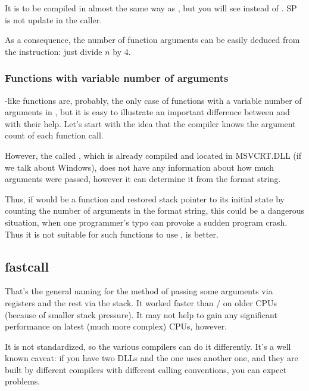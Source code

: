 It is to be compiled in almost the same way as , but you will see  instead of .
\ac{SP} is not update in the \gls{caller}.

As a consequence, 
the number of function arguments can be easily deduced from the  instruction: just divide $n$ by 4.



\subsubsection{Functions with variable number of arguments}

\printf-like functions are, probably, the only case of functions with a variable number of arguments in \CCpp,
but it is easy to illustrate an important difference between  and  with their help.
Let's start with the idea that the compiler knows the argument count of each \printf function call.

However, the called \printf, which is already compiled and located in MSVCRT.DLL (if we talk about Windows),
does not have any information about how much arguments were passed, however it can determine it from the format string.

Thus, if \printf would be a  function and restored \gls{stack pointer} to its initial state by counting
the number of arguments in the format string, this could be a dangerous situation, when one programmer's typo can
provoke a sudden program crash.
Thus it is not suitable for such functions to use ,  is better.

\subsection{fastcall}
\label{fastcall}

That's the general naming for the method of passing some arguments via registers and the 
rest via the stack. It worked faster than / on older CPUs 
(because of smaller stack pressure).
It may not help to gain any significant performance on latest (much more complex) \ac{CPU}s, however.

It is not standardized, so the various compilers can do it differently.
It's a well known caveat: if you have two DLLs and the one uses another one, and they are built by different compilers with 
different  calling conventions, you can expect problems.

